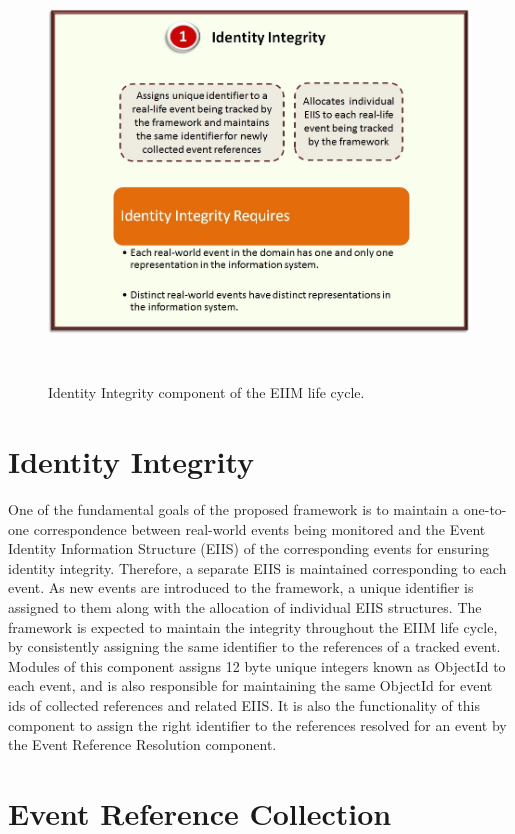 \begin{figure}[htbp]
  \caption{Identity Integrity component of the EIIM life cycle.}
  \centering
    \includegraphics[width=14cm,height=11cm]{Figures/EIIMComponents/IdentityIntegrity.jpg}
\end{figure}

\section{Identity Integrity}
One of the fundamental goals of the proposed framework is to maintain a one-to-one correspondence between real-world events being monitored and the Event Identity Information Structure (EIIS) of the corresponding events for ensuring identity integrity. Therefore, a separate EIIS is maintained corresponding to each event. As new events are introduced to the framework, a unique identifier is assigned to them along with the allocation of individual EIIS structures. The framework is expected to maintain the integrity throughout the EIIM life cycle, by consistently assigning the same identifier to the references of a tracked event. Modules of this component assigns 12 byte unique integers known as ObjectId  to each event, and is also responsible for maintaining the same ObjectId for event ids of collected references and related EIIS. It is also the functionality of this component to assign the right identifier to the references resolved for an event by the Event Reference Resolution component.


\section{Event Reference Collection\label{eventreferencecollection}}

